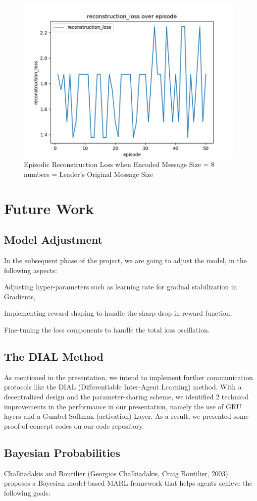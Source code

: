 \documentclass[a4paper,11pt]{article}
\begin{document}
\begin{figure}
    \centering
    \includegraphics[width=0.5\linewidth]{fig5.png}
    \caption{Episodic Reconstruction Loss when Encoded Message Size = 8 numbers  = Leader’s Original Message Size }
    \label{fig:enter-label}
\end{figure}

\section{Future Work}
\subsection{Model Adjustment}
In the subsequent phase of the project, we are going to adjust the model, in the following aspects: 

    Adjusting hyper-parameters such as learning rate for gradual stabilization in Gradients, 

    Implementing reward shaping to handle the sharp drop in reward function, 

    Fine-tuning the loss components to handle the total loss oscillation. 

\subsection{The DIAL Method}
As mentioned in the presentation, we intend to implement further communication protocols like the DIAL (Differentiable Inter-Agent Learning) method. With a decentralized design and the parameter-sharing scheme, we identified 2 technical improvements in the performance in our presentation, namely the use of GRU layers and a Gumbel Softmax (activation) Layer. As a result, we presented some proof-of-concept codes on our code repository.

\subsection{Bayesian Probabilities}
Chalkiadakis and Boutilier ​(Georgios Chalkiadakis, Craig Boutilier, 2003)​ proposes a Bayesian model-based MARL framework that helps agents achieve the following goals: 
\end{document}
